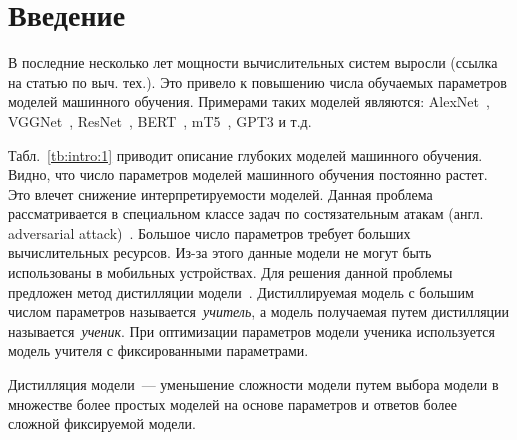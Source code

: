 \documentclass[12pt]{a&t}
\begin{document}
\section{Введение}
В последние несколько лет мощности вычислительных систем выросли (ссылка на статью по выч. тех.). Это привело к повышению числа обучаемых параметров моделей машинного обучения. Примерами таких моделей являются: AlexNet~\cite{Krizhevsky2012}, VGGNet~\cite{Simonyan2014}, ResNet~\cite{Kaiming2015}, BERT~\cite{Devlin2018, Vaswani2017}, mT5~\cite{Linting2021}, GPT3\cite{Brown2020} и т.д.
\begin{table}[h!]
\caption{Число параметров в моделях машинного обучения.}
\label{tb:intro:1}
\begin{center}
\end{center}
\end{table}
Табл.~\ref{tb:intro:1} приводит описание глубоких моделей машинного обучения. Видно, что число параметров моделей машинного обучения постоянно растет. Это влечет снижение интерпретируемости моделей. Данная проблема рассматривается в специальном классе задач по состязательным атакам (англ. adversarial attack)~\cite{Zheng2020}. Большое число параметров требует больших вычислительных ресурсов. Из-за этого данные модели не могут быть использованы в мобильных устройствах. Для решения данной проблемы предложен метод дистилляции модели~\cite{Hinton2015}. Дистиллируемая модель с большим числом параметров называется~\textit{учитель}, а модель получаемая путем дистилляции называется~\textit{ученик}. При оптимизации параметров модели ученика используется модель учителя с фиксированными параметрами.
\begin{definition}
Дистилляция модели~--- уменьшение сложности модели путем выбора модели в множестве более простых моделей на основе параметров и ответов более сложной фиксируемой модели.
\end{definition}
\end{document}
